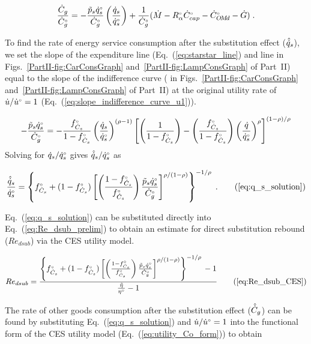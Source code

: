 \begin{equation} \label{eq:starstar_line}
  \frac{\dot{C}_g}{{}{\dot{C}}^{\scriptscriptstyle \circ}_g} = 
      -\frac{\tilde{p}_s {}{\dot{q}}^{\scriptscriptstyle \circ}_s}
            {{}{\dot{C}}^{\scriptscriptstyle \circ}_g}
        \left(  \frac{\dot{q}_s}{{}{\dot{q}}^{\scriptscriptstyle \circ}_s} \right)
      + \frac{1}{{}{\dot{C}}^{\scriptscriptstyle \circ}_g} 
        (\dot{M} - {}{R}^{\scriptscriptstyle \circ}_\alpha {}{\dot{C}}^{\scriptscriptstyle \circ}_{cap} - {}{\dot{C}}^{\scriptscriptstyle \circ}_{O\!M\!d} - \dot{G}) \; .
\end{equation}

To find the rate of energy service consumption after the substitution effect
($\hat{\dot{q}}_s$), we set the slope of the 
expenditure line (Eq.~(\ref{eq:starstar_line})
and line \starstar{} in 
Figs.~\ref{PartII-fig:CarConsGraph} 
and~\ref{PartII-fig:LampConsGraph} of Part~II)
equal to the slope of the 
indifference curve 
(\iicirc{} in 
Figs.~\ref{PartII-fig:CarConsGraph} 
and~\ref{PartII-fig:LampConsGraph} of Part~II)
at the original utility rate of $\dot{u}/{}{\dot{u}}^{\scriptscriptstyle \circ} = 1$ (Eq.~(\ref{eq:slope_indifference_curve_u1})).

\begin{equation}
  -\frac{\amacro{p}_s \rbempl{q}_s}
        {\rbempl{C}_g} = 
    -\frac{\fCs}{1 - \fCs} \left( \frac{\rate{q}_s}{\rbempl{q}_s} \right)^{(\rho -1)} %
        \left[ \left( \frac{1}{1 - \fCs} \right) 
                - \left( \frac{\fCs}{1 - \fCs} \right) 
                          \left( \frac{\rate{q}}{\rbempl{q}_s} \right)^\rho \right]^{(1 - \rho)/\rho}
\end{equation}
%
Solving for $\dot{q}_s/{}{\dot{q}}^{\scriptscriptstyle \circ}_s$ gives $\hat{\dot{q}}_s/{}{\dot{q}}^{\scriptscriptstyle \circ}_s$ as

\begin{equation}
  \frac{\rasub{q}_s}{\rbempl{q}_s} = \qssolution{} \; . \tag{\ref{eq:q_s_solution}}
\end{equation}

Eq.~(\ref{eq:q_s_solution}) can be substituted directly
into Eq.~(\ref{eq:Re_dsub_prelim})
to obtain an estimate for direct substitution rebound ($Re_{dsub}$)
via the CES utility model.

\begin{equation}
  Re_{dsub} = \RedsubCES{} \tag{\ref{eq:Re_dsub_CES}}
\end{equation}

The rate of other goods consumption after the substitution effect ($\hat{\dot{C}}_g$) 
can be found by substituting Eq.~(\ref{eq:q_s_solution}) and 
$\dot{u}/{}{\dot{u}}^{\scriptscriptstyle \circ} = 1$ 
into the functional form of the CES utility model (Eq.~(\ref{eq:utility_Co_form}))
to obtain

